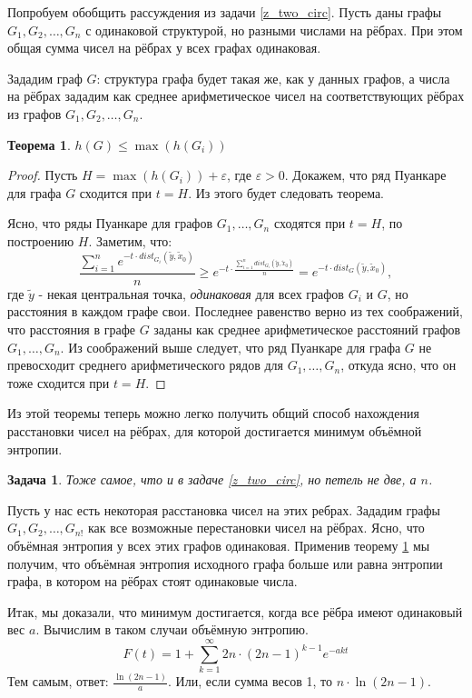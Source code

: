 \documentclass[11pt]{article}
\theoremstyle{definition}
\theoremstyle{plain}
\theoremstyle{plain}
\newtheorem{problem}{Задача}
\newtheorem{theorem}{Теорема}
\def\leq{\leqslant}
\def\geq{\geqslant}
\def\wt#1{\widetilde{#1}}
\def\eps{\varepsilon}
\begin{document}
\bigskip
Попробуем обобщить рассуждения из задачи \ref{z_two_circ}. 
Пусть даны графы $G_1,G_2,\dots,G_n$ с одинаковой структурой, но разными числами на рёбрах. 
При этом общая сумма чисел на рёбрах у всех графах одинаковая.

Зададим граф $G$: структура графа будет такая же, как у данных графов, а числа на рёбрах зададим как 
среднее арифметическое чисел на соответствующих рёбрах из графов $G_1, G_2, \dots, G_n$.

\begin{theorem}\label{t_srar}
$ h(G) \leq \max(h(G_i))$
\end{theorem}
\begin{proof}
Пусть $H = \max(h(G_i)) + \eps$, где $\eps > 0$. 
Докажем, что ряд Пуанкаре для графа $G$ сходится при $t=H$. Из этого будет следовать теорема.

Ясно, что ряды Пуанкаре для графов $G_1,\dots,G_n$ сходятся при $t=H$, по построению $H$.
Заметим, что:
$$
\frac{\sum_{i=1}^n e^{-t \cdot dist_{G_i}(\wt{y}, \wt{x}_0)}}{n} \geq 
e^{-t \cdot \frac{\sum_{i=1}^n dist_{G_i}(\wt{y}, \wt{x}_0)}{n} } = 
e^{-t \cdot dist_{G}(\wt{y}, \wt{x}_0)},
$$
где $\wt{y}$ - некая центральная точка, {\it одинаковая} для всех графов $G_i$ и $G$, но расстояния в каждом графе свои.
Последнее равенство верно из тех соображений, что расстояния в графе $G$ заданы как среднее арифметическое расстояний графов $G_1,\dots, G_n$.
Из соображений выше следует, что ряд Пуанкаре для графа $G$ не превосходит среднего арифметического рядов для $G_1, \dots, G_n$, 
откуда ясно, что он тоже сходится при $t=H$.
\end{proof}

Из этой теоремы теперь можно легко получить общий способ нахождения расстановки чисел на рёбрах, 
для которой достигается минимум объёмной энтропии.

\begin{problem} 
Тоже самое, что и в задаче \ref{z_two_circ}, но петель не две, а $n$.
\end{problem}

Пусть у нас есть некоторая расстановка чисел на этих ребрах. 
Зададим графы $G_1, G_2, \dots, G_{n!}$ как все возможные перестановки чисел на рёбрах.
Ясно, что объёмная энтропия у всех этих графов одинаковая.
Применив теорему \ref{t_srar} мы получим, что объёмная энтропия исходного графа больше или равна энтропии графа, 
в котором на рёбрах стоят одинаковые числа.

Итак, мы доказали, что минимум достигается, когда все рёбра имеют одинаковый вес $a$. 
Вычислим в таком случаи объёмную энтропию.
$$
F(t) = 1 + \sum_{k = 1}^{\infty} 2n\cdot (2n-1)^{k-1} e^{-akt}
$$
Тем самым, ответ: $\frac{\ln(2n-1)}{a}$. Или, если сумма весов 1, то $n\cdot \ln(2n-1)$.
\end{document}
